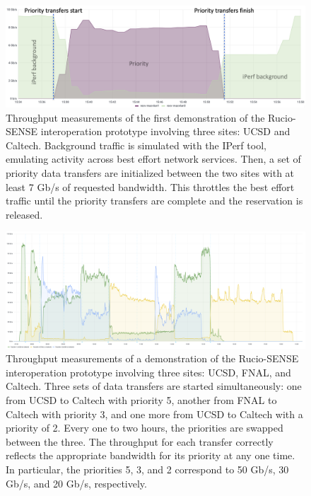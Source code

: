 \begin{figure}[htb]
    \centering
    \includegraphics[width=.9\textwidth]{fig/cyber/rucio-sense_demo.png}
    \caption[Rucio-SENSE interoperation throughput with 2 sites in the testbed]{
        Throughput measurements of the first demonstration of the Rucio-SENSE interoperation prototype involving three sites: UCSD and Caltech. 
        Background traffic is simulated with the IPerf tool, emulating activity across best effort network services. 
        Then, a set of priority data transfers are initialized between the two sites with at least 7 Gb/s of requested bandwidth. 
        This throttles the best effort traffic until the priority transfers are complete and the reservation is released. 
    }
    \label{fig:rucio_sense_demo}
\end{figure}

\begin{figure}[htb]
    \centering
    \includegraphics[width=.9\textwidth]{fig/cyber/rucio-sense_demo_big.png}
    \caption[Rucio-SENSE interoperation throughput with 3 sites in the testbed]{
        Throughput measurements of a demonstration of the Rucio-SENSE interoperation prototype involving three sites: UCSD, FNAL, and Caltech. 
        Three sets of data transfers are started simultaneously: one from UCSD to Caltech with priority 5, another from FNAL to Caltech with priority 3, and one more from UCSD to Caltech with a priority of 2. 
        Every one to two hours, the priorities are swapped between the three. 
        The throughput for each transfer correctly reflects the appropriate bandwidth for its priority at any one time. 
        In particular, the priorities 5, 3, and 2 correspond to 50 Gb/s, 30 Gb/s, and 20 Gb/s, respectively.
      }
    \label{fig:rucio_sense_demo_big}
\end{figure}


